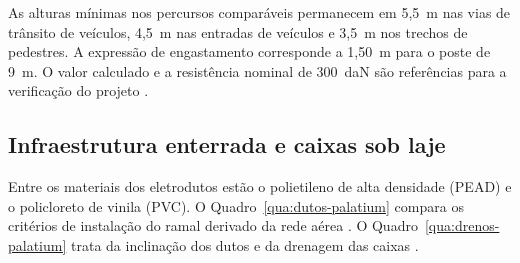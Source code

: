 As alturas mínimas nos percursos comparáveis permanecem em 5,5~m nas vias de trânsito de veículos, 4,5~m nas entradas de veículos e 3,5~m nos trechos de pedestres. A expressão de engastamento corresponde a 1,50~m para o poste de 9~m. O valor calculado e a resistência nominal de 300~daN são referências para a verificação do projeto \cite[tabelas~8 e~11]{enel0126}\cite[tabela~18 e Desenho~1]{enel1580}.

\subsection{Infraestrutura enterrada e caixas sob laje}\label{subsec:impacto-eletrodutos-drenagem}\label{subsec:impacto-caixas-passagem}

Entre os materiais dos eletrodutos estão o polietileno de alta densidade (PEAD) e o policloreto de vinila (PVC). O Quadro~\ref{qua:dutos-palatium} compara os critérios de instalação do ramal derivado da rede aérea \cite[item~7.6.1.4 e Desenhos~003.02 e~003.15]{enel0126}\cite[item~7.19.7 e Anexos~8.100 e~8.101]{enel1580}. O Quadro~\ref{qua:drenos-palatium} trata da inclinação dos dutos e da drenagem das caixas \cite[Desenhos~003.15 e~003.17]{enel0126}\cite[itens~7.19.1 e~7.19.7]{enel1580}.

